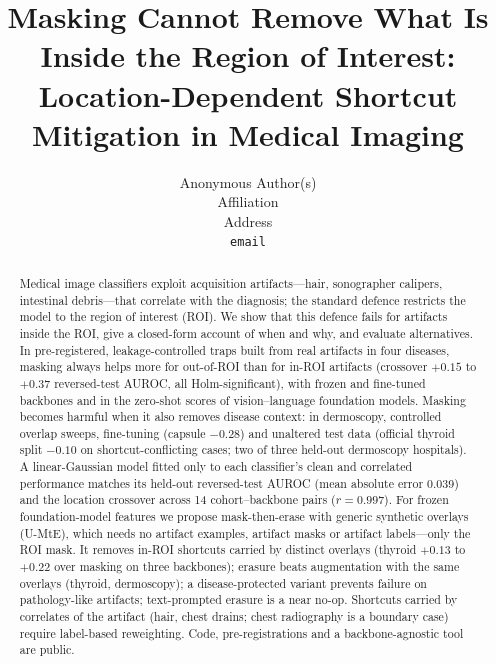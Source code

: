 \documentclass{article}
\title{Masking Cannot Remove What Is Inside the Region of Interest: Location-Dependent Shortcut Mitigation in Medical Imaging}
\author{Anonymous Author(s)\\Affiliation\\Address\\\texttt{email}}
\begin{document}
\maketitle

\begin{abstract}
Medical image classifiers exploit acquisition artifacts---hair, sonographer calipers, intestinal debris---that
correlate with the diagnosis; the standard defence restricts the model to the region of interest (ROI). We show that
this defence fails for artifacts inside the ROI, give a closed-form account of when and why, and evaluate
alternatives. In pre-registered, leakage-controlled traps built from real artifacts in four diseases, masking always
helps more for out-of-ROI than for in-ROI artifacts (crossover $+0.15$ to $+0.37$ reversed-test AUROC, all
Holm-significant), with frozen and fine-tuned backbones and in the zero-shot scores of vision--language foundation
models. Masking becomes harmful when it also removes disease context: in dermoscopy, controlled overlap sweeps,
fine-tuning (capsule $-0.28$) and unaltered test data (official thyroid split $-0.10$ on shortcut-conflicting cases;
two of three held-out dermoscopy hospitals). A linear-Gaussian model fitted only to each classifier's clean and
correlated performance matches its held-out reversed-test AUROC (mean absolute error 0.039) and the location crossover
across 14 cohort--backbone pairs ($r=0.997$). For frozen foundation-model features we propose mask-then-erase with
generic synthetic overlays (U-MtE), which needs no artifact examples, artifact masks or artifact labels---only the ROI
mask. It removes in-ROI shortcuts carried by distinct overlays (thyroid $+0.13$ to $+0.22$ over masking on three
backbones); erasure beats augmentation with the same overlays (thyroid, dermoscopy); a disease-protected variant prevents failure on
pathology-like artifacts; text-prompted erasure is a near no-op. Shortcuts carried by correlates of the artifact
(hair, chest drains; chest radiography is a boundary case) require label-based reweighting. Code, pre-registrations
and a backbone-agnostic tool are public.
\end{abstract}
\end{document}
